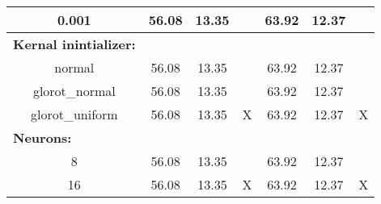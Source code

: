 \begin{table}[H]
\begin{tabular}{ccccccc}
0.001                                             & 56.08                                                    & 13.35    &                                                             & 63.92                                                   & 12.37    &                                                             \\ \hline
\multicolumn{1}{l}{\textbf{Kernal inintializer:}} &                                                          &          &                                                             &                                                         &          &                                                             \\
normal                                            & 56.08                                                    & 13.35    &                                                             & 63.92                                                   & 12.37    &                                                             \\
glorot\_normal                                    & 56.08                                                    & 13.35    &                                                             & 63.92                                                   & 12.37    &                                                             \\
glorot\_uniform                                   & 56.08                                                    & 13.35    & X                                                           & 63.92                                                   & 12.37    & X                                                           \\ \hline
\multicolumn{1}{l}{\textbf{Neurons:}}             &                                                          &          &                                                             &                                                         &          &                                                             \\
8                                                 & 56.08                                                    & 13.35    &                                                             & 63.92                                                   & 12.37    &                                                             \\
16                                                & 56.08                                                    & 13.35    & X                                                           & 63.92                                                   & 12.37    & X                                                           \\

\end{tabular}
\end{table}
